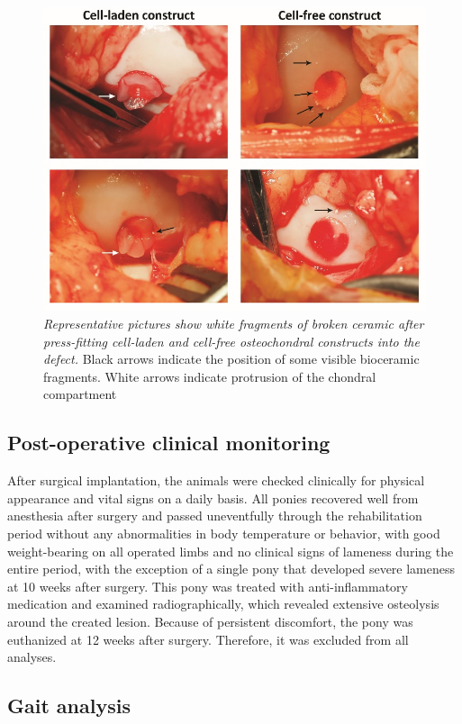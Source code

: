 \documentclass[twocolumn, empirical, authordate, issue]{jote-new-article}
\begin{document}
\begin{figure}
\centering \includegraphics[width=\columnwidth]{media/image5.jpg}
\caption{\emph{Representative pictures show white fragments of broken ceramic after press-fitting cell-laden and cell-free osteochondral constructs into the defect.} Black arrows indicate the position of some visible bioceramic fragments. White arrows indicate protrusion of the chondral compartment}
\label{fig:figure5}\end{figure}


\subsection{Post-operative clinical monitoring} 

After surgical implantation, the animals were checked clinically for physical appearance and vital signs on a daily basis. All ponies recovered well from anesthesia after surgery and passed uneventfully through the rehabilitation period without any abnormalities in body temperature or behavior, with good weight-bearing on all operated limbs and no clinical signs of lameness during the entire period, with the exception of a single pony that developed severe lameness at 10 weeks after surgery. This pony was treated with anti-inflammatory medication and examined radiographically, which revealed extensive osteolysis around the created lesion. Because of persistent discomfort, the pony was euthanized at 12 weeks after surgery. Therefore, it was excluded from all analyses.

\subsection{Gait analysis} 
\end{document}
